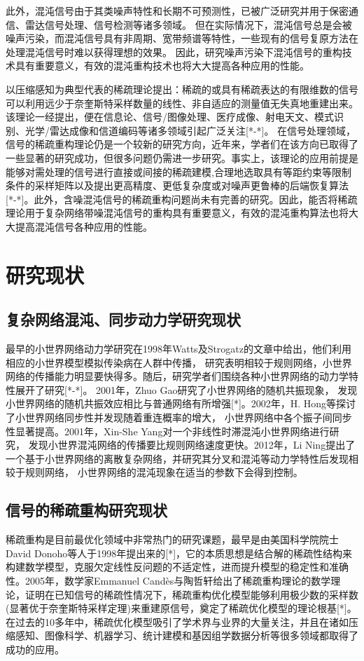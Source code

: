 此外，混沌信号由于其类噪声特性和长期不可预测性，已被广泛研究并用于保密通信、雷达信号处理、信号检测等诸多领域。
但在实际情况下，混沌信号总是会被噪声污染，而混沌信号具有非周期、宽带频谱等特性，一些现有的信号复原方法在处理混沌信号时难以获得理想的效果。
因此，研究噪声污染下混沌信号的重构技术具有重要意义，有效的混沌重构技术也将大大提高各种应用的性能。

以压缩感知为典型代表的稀疏理论提出：稀疏的或具有稀疏表达的有限维数的信号可以利用远少于奈奎斯特采样数量的线性、非自适应的测量值无失真地重建出来。
该理论一经提出，便在信息论、信号/图像处理、医疗成像、射电天文、模式识别、光学/雷达成像和信道编码等诸多领域引起广泛关注[*-*]。
在信号处理领域，信号的稀疏重构理论仍是一个较新的研究方向，近年来，学者们在该方向已取得了一些显著的研究成功，但很多问题仍需进一步研究。事实上，该理论的应用前提是能够对需处理的信号进行直接或间接的稀疏建模,合理地选取具有等距约束等限制条件的采样矩阵以及提出更高精度、更低复杂度或对噪声更鲁棒的后端恢复算法[*-*]。此外，含噪混沌信号的稀疏重构问题尚未有完善的研究。因此，能否将稀疏理论用于复杂网络带噪混沌信号的重构具有重要意义，有效的混沌重构算法也将大大提高混沌信号各种应用的性能。

\section{研究现状}
\subsection{复杂网络混沌、同步动力学研究现状}
最早的小世界网络动力学研究在1998年Watts及Strogatz的文章中给出，他们利用相应的小世界模型模拟传染病在人群中传播，
研究表明相较于规则网络，小世界网络的传播能力明显要快得多。随后，研究学者们围绕各种小世界网络的动力学特性展开了研究[*-*]。
2001年，Zhuo Gao研究了小世界网络的随机共振现象，
发现小世界网络的随机共振效应相比与普通网络有所增强[*]。2002年，H. Hong等探讨了小世界网络同步性并发现随着重连概率的增大，
小世界网络中各个振子间同步性显著提高。2001年，Xin-She Yang对一个非线性时滞混沌小世界网络进行研究，
发现小世界混沌网络的传播要比规则网络速度更快。2012年，Li Ning提出了一个基于小世界网络的离散复杂网络，并研究其分叉和混沌等动力学特性后发现相较于规则网络，
小世界网络的混沌现象在适当的参数下会得到控制。
\subsection{信号的稀疏重构研究现状}
稀疏重构是目前最优化领域中非常热门的研究课题，最早是由美国科学院院士David Donoho等人于1998年提出来的[*]，它的本质思想是结合解的稀疏性结构来构建数学模型，克服欠定线性反问题的不适定性，进而提升模型的稳定性和准确性。2005年，数学家Emmanuel Candès与陶哲轩给出了稀疏重构理论的数学理论，证明在已知信号的稀疏性情况下，稀疏重构优化模型能够利用极少数的采样数(显著优于奈奎斯特采样定理)来重建原信号，奠定了稀疏优化模型的理论根基[*]。在过去的10多年中，稀疏优化模型吸引了学术界与业界的大量关注，并且在诸如压缩感知、图像科学、机器学习、统计建模和基因组学数据分析等很多领域都取得了成功的应用。

